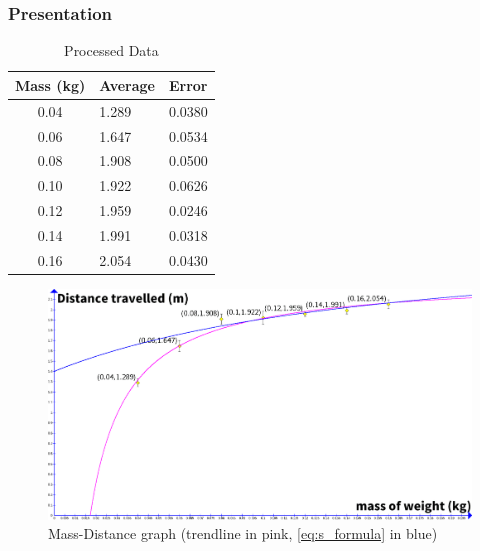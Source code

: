 \documentclass[titlepage,12pt]{article}
\begin{document}
        \subsubsection{Presentation}
            \FloatBarrier
            \begin{table}[H]
                \centering
                \def\arraystretch{1.5}
                \begin{tabularx}{\textwidth}{c|X|X}
                    Mass (kg) & Average & Error\\ 
                    \hline
                    \hline
                    0.04 & 1.289 & 0.0380\\ 
                    \hline
                    0.06 & 1.647 & 0.0534\\ 
                    \hline
                    0.08 & 1.908 & 0.0500\\ 
                    \hline
                    0.10 & 1.922 & 0.0626\\ 
                    \hline
                    0.12 & 1.959 & 0.0246\\ 
                    \hline
                    0.14 & 1.991 & 0.0318\\ 
                    \hline
                    0.16 & 2.054 & 0.0430\\ 
                \end{tabularx}
                \caption{Processed Data} 
                \label{table:processed data}
            \end{table}

            \begin{figure}[H]
                \label{fig:mass-distance-graph}
                \centering
                \includegraphics[scale=0.28]{mass-distance_graph}
                \caption{Mass-Distance graph (trendline in pink, 
                    \autoref{eq:s_formula} in blue)}
            \end{figure}
    
\end{document}
